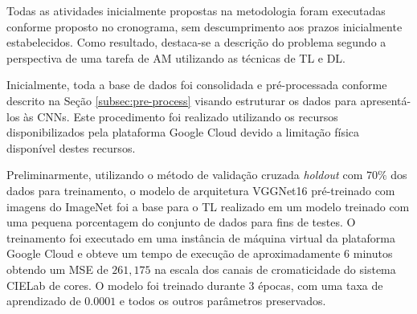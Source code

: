 Todas as atividades inicialmente propostas na metodologia foram executadas conforme proposto no cronograma, sem descumprimento aos prazos inicialmente estabelecidos. Como resultado, destaca-se a descrição do problema segundo a perspectiva de uma tarefa de AM utilizando as técnicas de TL e DL.

Inicialmente, toda a base de dados foi consolidada e pré-processada conforme descrito na Seção \ref{subsec:pre-process} visando estruturar os dados para apresentá-los às CNNs. Este procedimento foi realizado utilizando os recursos disponibilizados pela plataforma Google Cloud devido a limitação física disponível destes recursos.

Preliminarmente, utilizando o método de validação cruzada \emph{holdout} com $70\%$ dos dados para treinamento, o modelo de arquitetura VGGNet16 pré-treinado com imagens do ImageNet foi a base para o TL realizado em um modelo treinado com uma pequena porcentagem do conjunto de dados para fins de testes. O treinamento foi executado em uma instância de máquina virtual da plataforma Google Cloud e obteve um tempo de execução de aproximadamente 6 minutos obtendo um MSE de $261,175$ na escala dos canais de cromaticidade do sistema CIELab de cores. O modelo foi treinado durante $3$ épocas, com uma taxa de aprendizado de $0.0001$ e todos os outros parâmetros preservados. 
